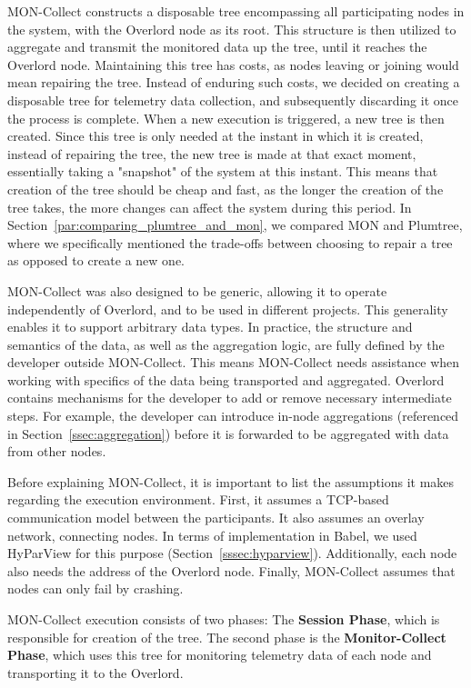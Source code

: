 MON-Collect constructs a disposable tree encompassing all participating nodes in the system, with the Overlord node as its root. This structure is then utilized to aggregate and transmit the monitored data up the tree, until it reaches the Overlord node. Maintaining this tree has costs, as nodes leaving or joining would mean repairing the tree\cite{Leitao2007a,Liang2005}. Instead of enduring such costs, we decided on creating a disposable tree for telemetry data collection, and subsequently discarding it once the process is complete. When a new execution is triggered, a new tree is then created. Since this tree is only needed at the instant in which it is created, instead of repairing the tree, the new tree is made at that exact moment, essentially taking a "snapshot" of the system at this instant. This means that creation of the tree should be cheap and fast, as the longer the creation of the tree takes, the more changes can affect the system during this period. In Section~\ref{par:comparing_plumtree_and_mon}, we compared MON and Plumtree, where we specifically mentioned the trade-offs between choosing to repair a tree as opposed to create a new one.

MON-Collect was also designed to be generic, allowing it to operate independently of Overlord, and to be used in different projects. This generality enables it to support arbitrary data types. In practice, the structure and semantics of the data, as well as the aggregation logic, are fully defined by the developer outside MON-Collect. This means MON-Collect needs assistance when working with specifics of the data being transported and aggregated. Overlord contains mechanisms for the developer to add or remove necessary intermediate steps. For example, the developer can introduce in-node aggregations (referenced in Section~\ref{ssec:aggregation}) before it is forwarded to be aggregated with data from other nodes.

Before explaining MON-Collect, it is important to list the assumptions it makes regarding the execution environment. First, it assumes a TCP-based communication model between the participants. It also assumes an overlay network, connecting nodes. In terms of implementation in Babel, we used HyParView for this purpose (Section~\ref{sssec:hyparview}). Additionally, each node also needs the address of the Overlord node. Finally, MON-Collect assumes that nodes can only fail by crashing.

MON-Collect execution consists of two phases: The \textbf{Session Phase}, which is responsible for creation of the tree. The second phase is the \textbf{Monitor-Collect Phase}, which uses this tree for monitoring telemetry data of each node and transporting it to the Overlord.

